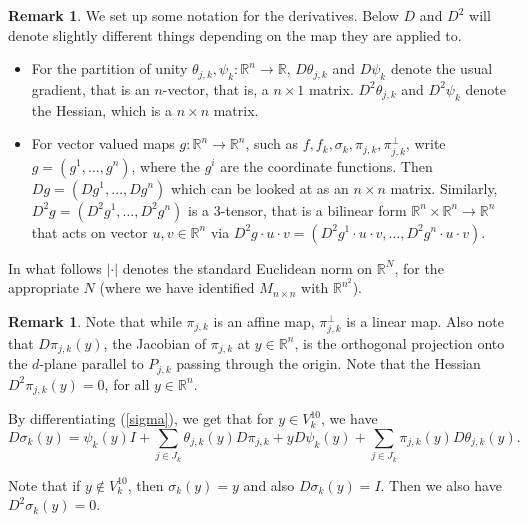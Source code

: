 \documentclass[11pt, twoside, leqno]{article}
\numberwithin{equation}{section}
\theoremstyle{plain}
\theoremstyle{definition}
\newtheorem{rk}[thm]{Remark}
\newcommand{\R}{\mathbb{R}}
\begin{document}
\begin{rk} \label{notation}
We set up some notation for the derivatives. Below $D$ and $D^2$ will denote slightly different things depending on the map they are applied to. 
\begin{itemize}
\item For the partition of unity $\theta_{j,k}, \psi_k \colon \R^n \to \R$, $D\theta_{j,k}$ and $D\psi_k$ denote the usual gradient, that is an $n$-vector, that is, a $n \times 1$ matrix. $D^2 \theta_{j,k}$ and $D^2 \psi_k$ denote the Hessian, which is a $n \times n$ matrix.
\item For vector valued maps $g \colon \R^n \to \R^n$, such as $f, f_k, \sigma_k, \pi_{j,k}, \pi_{j,k}^{\perp}$, write $g=(g^1, \dots, g^n)$, where the $g^i$ are the coordinate functions. Then $Dg=(Dg^1, \dots, Dg^n)$ which can be looked at as an $n \times n$ matrix. Similarly, $D^2g=(D^2g^1, \dots, D^2g^n)$ is a $3$-tensor, that is a bilinear form $\R^n \times \R^n \to \R^n$ that acts on vector $u,v \in \R^n$ via $D^2g\cdot u \cdot v =(D^2g^1\cdot u \cdot v, \dots, D^2g^n\cdot u \cdot v)$.
\end{itemize}
 In what follows $|\cdot|$ denotes the standard Euclidean norm on $\R^N$, for the appropriate $N$ (where we have identified $M_{n\times n}$ with $\R^{n^2}$).
\end{rk}

\begin{rk} \label{d2=0}
Note that while $\pi_{j,k}$ is an affine map, $\pi^{\perp}_{j,k}$ is a linear map. Also note that $D\pi_{j,k}(y)$, the Jacobian of $\pi_{j,k}$  at $y \in \R^n$, is the orthogonal projection onto the $d$-plane parallel to $P_{j,k}$ passing through the origin. Note that the Hessian $D^2\pi_{j,k}(y)=0$, for all $y \in \R^n$.  
\end{rk}

By differentiating (\ref{sigma}), we get that for $y \in V_k^{10}$, we have
\begin{equation} \label{dsigma}
D\sigma_k(y)= \psi_k(y)I + \sum_{j \in J_k} \theta_{j,k}(y)D\pi_{j,k} + yD\psi_k(y) + \sum_{j \in J_k} \pi_{j,k}(y) D\theta_{j,k}(y).
\end{equation}

Note that if $y \notin V_k^{10}$, then $\sigma_k(y)=y$ and also $D\sigma_k(y)=I$. Then we also have $D^2\sigma_k(y)=0$.
\end{document}
